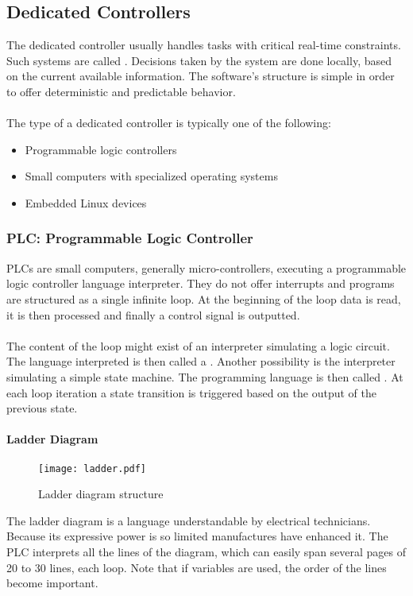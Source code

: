 \documentclass[../main.tex]{subfiles}
\begin{document}
\subsection{Dedicated Controllers}
The dedicated controller usually handles tasks with critical real-time constraints. Such systems are called . Decisions taken by the system are done locally, based on the current available information. The software's structure is simple in order to offer deterministic and predictable behavior.
\\\\
The type of a dedicated controller is typically one of the following:
\begin{itemize}
	\item Programmable logic controllers
	\item Small computers with specialized operating systems
	\item Embedded Linux devices
\end{itemize}

\subsubsection{PLC: Programmable Logic Controller}
PLCs are small computers, generally micro-controllers, executing a programmable logic controller language interpreter. They do not offer interrupts and programs are structured as a single infinite loop. At the beginning of the loop data is read, it is then processed and finally a control signal is outputted.
\\\\
The content of the loop might exist of an interpreter simulating a logic circuit. The language interpreted is then called a . Another possibility is the interpreter simulating a simple state machine. The programming language is then called . At each loop iteration a state transition is triggered based on the output of the previous state.

\paragraph{Ladder Diagram}
\begin{figure}[H]
    \centering
    \texttt{[image: ladder.pdf]}
    \caption{Ladder diagram structure}
    \label{ladderdiagram}
\end{figure}
The ladder diagram is a language understandable by electrical technicians. Because its expressive power is so limited manufactures have enhanced it. The PLC interprets all the lines of the diagram, which can easily span several pages of 20 to 30 lines, each loop. Note that if variables are used, the order of the lines become important.
 
\end{document}
